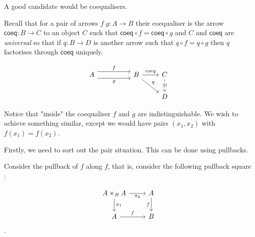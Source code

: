 \documentclass{article}
\newcommand{\id}[1]{\mathsf{#1}}
\begin{document}
A good candidate would be coequalisers. 

Recall that for a pair of arrows $f \; g : A \to B$ their coequaliser is the arrow $\id{coeq} : B \to C$ to an object $C$ such that $\id{coeq} \circ f = \id{coeq} \circ g$ and $C$ and $\id{coeq}$ are \emph{universal} so that if $q : B \to D$ is another arrow such that $q \circ f = q \circ g$ then $q$ factorises through $\id{coeq}$ uniquely. 

\[\begin{tikzcd}
	A && B & C \\
	&&& D
	\arrow["f", shift left=2, from=1-1, to=1-3]
	\arrow["g"', shift right=2, from=1-1, to=1-3]
	\arrow["coeq", from=1-3, to=1-4]
	\arrow["q", from=1-3, to=2-4]
	\arrow["{\exists!}"{description}, dashed, from=1-4, to=2-4]
\end{tikzcd}\]

Notice that "inside" the coequaliser $f$ and $g$ are indistinguishable. We wish to achieve something similar, except we would have pairs $(x_1,x_2)$ with $f(x_1) = f(x_2)$.

Firstly, we need to sort out the pair situation. This can be done using pullbacks. 

Consider the pullback of $f$ along $f$, that is, consider the following pullback square :

\[\begin{tikzcd}
	{A\times_BA} & A \\
	A & B
	\arrow["f", from=2-1, to=2-2]
	\arrow["f"', from=1-2, to=2-2]
	\arrow["{\pi_2}"', from=1-1, to=1-2]
	\arrow["{\pi_1}", from=1-1, to=2-1]
\end{tikzcd}\].


\end{document}
